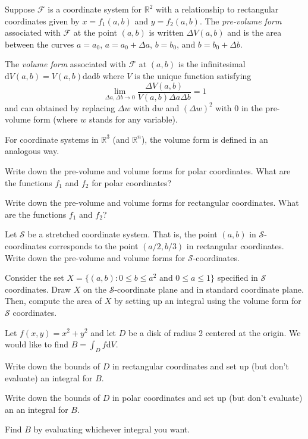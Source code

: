 \documentclass{problemset}
\newcommand{\R}{\mathbb{R}}
\renewcommand{\d}{\mathrm{d}}
\begin{document}
	\begin{definition}
		Suppose $\mathcal F$ is a coordinate system for $\R^2$ with a relationship
		to rectangular coordinates given by 
		$x=f_1(a,b)$ and $y=f_2(a,b)$.  The \emph{pre-volume form} associated with $\mathcal F$
		at the point $(a,b)$ is written $\Delta V(a,b)$ and is the area between the curves
		$a=a_0$, $a=a_0+\Delta a$, $b=b_0$, and $b=b_0+\Delta b$.

		The \emph{volume form} associated with $\mathcal F$ at $(a,b)$ is the infinitesimal 
		$\d V(a,b)=V(a,b)\d a\d b$ where $V$ is the unique function satisfying
		\[
			\lim_{\Delta a,\Delta b\to 0} \frac{\Delta V(a,b)}{V(a,b)\Delta a\Delta b} = 1
		\]
		and can obtained by replacing $\Delta w$ with $\d w$ and $(\Delta w)^2$ with $0$ in
		the pre-volume form (where $w$ stands for any variable).
	\end{definition}
	For coordinate systems in $\R^3$ (and $\R^n$), the volume form is defined in an analogous way.


	\question
	\begin{parts}
		\item Write down the pre-volume and volume forms for polar coordinates.  What are the functions
			$f_1$ and $f_2$ for polar coordinates?
		\item Write down the pre-volume and volume forms for rectangular coordinates.  What
			are the functions $f_1$ and $f_2$?
		\item Let $\mathcal S$ be a stretched coordinate system.  That is, the point $(a,b)$ in
			$\mathcal S$-coordinates corresponds to the point $(a/2, b/3)$ in rectangular 
			coordinates.  Write down the pre-volume and volume forms for $\mathcal S$-coordinates.
		\item Consider the set $X=\{(a,b): 0\leq b\leq a^2\text{ and }0\leq a\leq 1\}$ specified in $\mathcal S$ coordinates.
			Draw $X$ on the $\mathcal S$-coordinate plane and in standard coordinate plane.  Then, compute
			the area of $X$ by setting up an integral using the volume form for $\mathcal S$ coordinates.
	\end{parts}

	\question
	Let $f(x,y)=x^2+y^2$ and let $D$ be a disk of radius 2 centered at the origin.  We would like to
	find $B=\displaystyle \int_D f\d V$.
	\begin{parts}
		\item Write down the bounds of $D$ in rectangular coordinates and set up (but don't evaluate)
			an integral for $B$.
		\item Write down the bounds of $D$ in polar coordinates and set up (but don't evaluate) an 
			an integral for $B$.
		\item Find $B$ by evaluating whichever integral you want.
	\end{parts}
\end{document}
